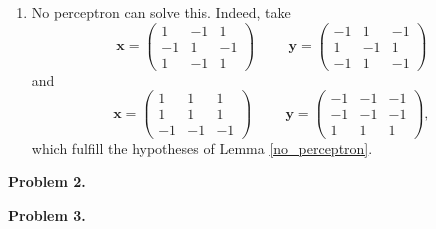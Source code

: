 \documentclass[12pt]{amsart}
\newcommand{\mbf}[1]{\mathbf{#1}}
\theoremstyle{remark}
\begin{document}
\begin{enumerate}
\item No perceptron can solve this. Indeed, take 
\[
\mbf{x} = \begin{pmatrix} 1 & -1 & 1 \\ -1 & 1 & -1 \\ 1 & -1 & 1 \end{pmatrix} \hspace{1cm} \mbf{y} = \begin{pmatrix} -1 & 1 & -1 \\ 1 & -1 & 1 \\ -1 & 1 & -1 \end{pmatrix} 
\]
 and  
\[
\mbf{x} = \begin{pmatrix} 1 & 1 & 1 \\ 1 & 1 & 1 \\ -1 & -1 & -1 \end{pmatrix} \hspace{1cm} \mbf{y} = \begin{pmatrix} -1 & -1 & -1 \\ -1 & -1 & -1 \\ 1 & 1 & 1 \end{pmatrix} ,
\]
which fulfill the hypotheses of Lemma \ref{no_perceptron}.
\end{enumerate}



\noindent \textbf{Problem 2.}

\noindent \textbf{Problem 3.}
\end{document}
